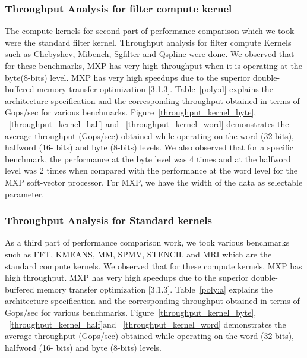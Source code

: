 
%
%
%



\subsubsection{Throughput Analysis for filter compute kernel}

The compute kernels for second part of performance comparison which we took were the standard filter kernel. Throughput analysis for filter compute Kernels such as Chebyshev, Mibench, Sgfilter and Qspline were done.
We observed that for these benchmarks, MXP has very high throughput when it is operating at the byte(8-bits) level. MXP has very high speedups due to the superior double-buffered memory transfer optimization [3.1.3]. Table~\ref{poly:d} explains the architecture specification and the corresponding throughput obtained in terms of Gops/sec for various benchmarks. Figure~\ref{throughput_kernel_byte}, ~\ref{throughput_kernel_half} and ~\ref{throughput_kernel_word} demonstrates the average throughput (Gops/sec) obtained while operating on the word (32-bits), halfword (16- bits) and byte (8-bits) levels.
 We also observed that for a specific benchmark, the performance at the byte level was 4 times and at the halfword level was 2 times when compared with the performance at the word level for the MXP soft-vector processor. For MXP, we have the width of the data as selectable parameter.


%
%
%
%
%
%

\subsubsection{Throughput Analysis for Standard kernels}

As a third part of performance comparison work, we took various benchmarks such as FFT, KMEANS, MM, SPMV, STENCIL and MRI which are the standard compute kernels. We observed that for these compute kernels, MXP has high throughput. MXP has very high speedups due to the superior double-buffered memory transfer optimization [3.1.3]. Table~\ref{poly:a} explains the architecture specification and the corresponding throughput obtained in terms of Gops/sec for various benchmarks. Figure~\ref{throughput_kernel_byte}, ~\ref{throughput_kernel_half}and ~\ref{throughput_kernel_word} demonstrates the average throughput (Gops/sec) obtained while operating on the word (32-bits), halfword (16- bits) and byte (8-bits) levels.

